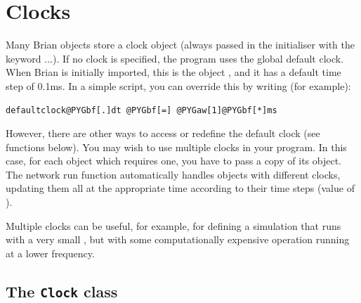 \documentclass[letterpaper,10pt,english]{manual}
\begin{document}
\hypertarget{index-115}{}\section{Clocks}
Many Brian objects store a clock object (always passed in the
initialiser with the keyword ...). If no clock is specified,
the program uses the global default clock. When Brian is initially
imported, this is the object \hyperlink{brian.defaultclock}{}, and it has a default
time step of 0.1ms. In a simple script, you can override this by
writing (for example):

\begin{Verbatim}[commandchars=@\[\]]
defaultclock@PYGbf[.]dt @PYGbf[=] @PYGaw[1]@PYGbf[*]ms
\end{Verbatim}

However, there are other ways to access or redefine the default
clock (see functions below).
You may wish to use multiple clocks in your program. In this case,
for each object which requires one, you have to pass a copy of its
\hyperlink{brian.Clock}{} object. The network run function automatically handles objects
with different clocks, updating them all at the appropriate time
according to their time steps (value of \hyperlink{brian.Clock.dt}{}).

Multiple clocks can be useful, for example, for defining a simulation
that runs with a very small , but with some computationally
expensive operation running at a lower frequency.


\subsection{The \texttt{Clock} class}
\end{document}
